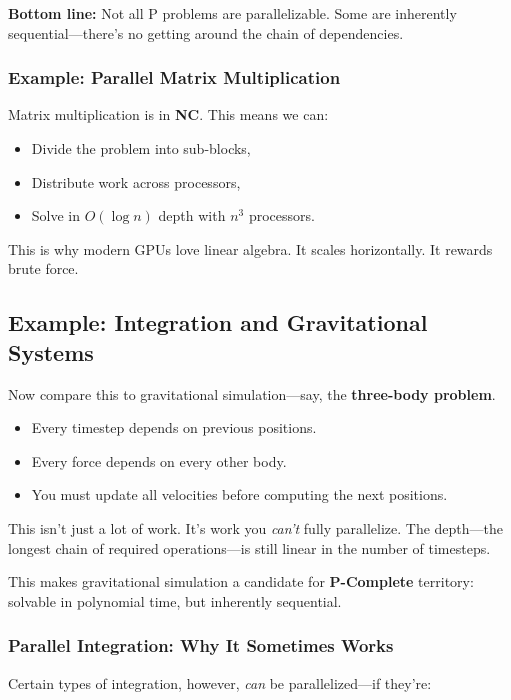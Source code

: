 \textbf{Bottom line:} Not all P problems are parallelizable. Some are inherently sequential—there’s no getting around the chain of dependencies.

\subsubsection{Example: Parallel Matrix Multiplication}

Matrix multiplication is in \textbf{NC}. This means we can:

\begin{itemize}
  \item Divide the problem into sub-blocks,
  \item Distribute work across processors,
  \item Solve in \( O(\log n) \) depth with \( n^3 \) processors.
\end{itemize}

This is why modern GPUs love linear algebra. It scales horizontally. It rewards brute force.

\subsection*{Example: Integration and Gravitational Systems}

Now compare this to gravitational simulation—say, the \textbf{three-body problem}.

\begin{itemize}
  \item Every timestep depends on previous positions.
  \item Every force depends on every other body.
  \item You must update all velocities before computing the next positions.
\end{itemize}

This isn’t just a lot of work. It’s work you \textit{can’t} fully parallelize. The depth—the longest chain of required operations—is still linear in the number of timesteps.

This makes gravitational simulation a candidate for \textbf{P-Complete} territory: solvable in polynomial time, but inherently sequential.

\subsubsection{Parallel Integration: Why It Sometimes Works}

Certain types of integration, however, \textit{can} be parallelized—if they’re:

